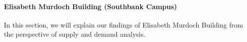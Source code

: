 



\paragraph{Elisabeth Murdoch Building (Southbank Campus)}
In this section, we will explain our findings of Elisabeth Murdoch Building from the perspective of supply and demand analysis.

